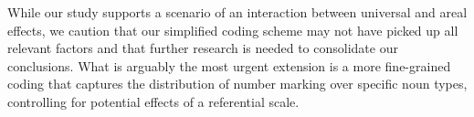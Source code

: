 \documentclass[11pt]{article}
\begin{document}
While our study supports a scenario of an interaction between universal and areal effects, we caution that our simplified coding scheme may not have picked up all relevant factors and that further research is needed to consolidate our conclusions. What is arguably the most urgent extension is a more fine-grained coding that captures the distribution of number marking over specific noun types, controlling for potential effects of a referential scale. 








\end{document}
